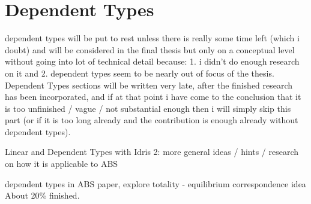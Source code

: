\chapter{Dependent Types}
dependent types will be put to rest unless there is really some time left (which i doubt) and will be considered in the final thesis but only on a conceptual level without going into lot of technical detail because: 1. i didn't do enough research on it and 2. dependent types seem to be nearly out of focus of the thesis. Dependent Types sections will be written very late, after the finished research has been incorporated, and if at that point i have come to the conclusion that it is too unfinished / vague / not substantial enough then i will simply skip this part (or if it is too long already and the contribution is enough already without dependent types).

Linear and Dependent Types with Idris 2: more general ideas / hints / research on how it is applicable to ABS

dependent types in ABS paper, explore totality - equilibrium correspondence idea
About 20\% finished.